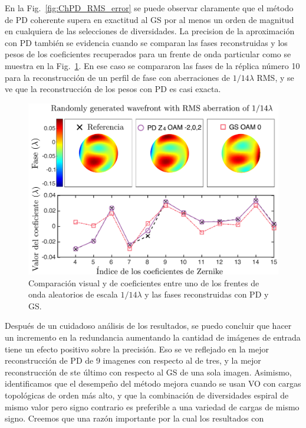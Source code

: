 En la Fig.~\ref{fig:ChPD_RMS_error} se puede observar claramente que
el método de PD coherente supera en 
exactitud al GS por al menos un orden de magnitud en cualquiera de las
selecciones de diversidades. La precision de la aproximación con PD
también se evidencia cuando se comparan las fases reconstruidas y los pesos
de los coeficientes recuperados para un frente de onda particular como
se muestra en la Fig.~\ref{fig:ChPD_visual_comparison}. En ese caso se
compararon las fases de la réplica número 10 para la reconstrucción de
un perfil de fase con aberraciones de $1/14\lambda$ RMS, y se ve
que la reconstrucción de los pesos con PD es casi exacta. 
\begin{figure}[h!]
\centering
\includegraphics[scale=.3]{phase_comparison_esp.pdf}
\caption[Resultados visuales de simulaciones de PD coherente para
aberración $1/14\lambda$]{Comparación visual y de coeficientes entre uno de los frentes
  de onda aleatorios de escala $1/14\lambda$ y las fases reconstruidas
  con PD y GS.} 
\label{fig:ChPD_visual_comparison}
\end{figure}
Después de un cuidadoso análisis de los resultados, se puedo concluir que hacer un
incremento en la redundancia aumentando la cantidad de imágenes de
entrada tiene un efecto positivo sobre la precisión. Eso se ve
reflejado en la mejor reconstrucción de PD de 9 imagenes con respecto
al de tres, y la mejor reconstrucción de ste último con respecto al GS
de una sola imagen.  Asimismo, identificamos que el desempeño del
método mejora cuando se usan VO con cargas topológicas de orden más
alto, y que la combinación de diversidades espiral de mismo valor pero
signo contrario es preferible a una variedad de cargas de mismo
signo. Creemos que una razón importante por la cual los resultados con
